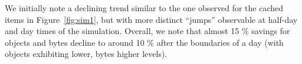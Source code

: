 \documentclass[letterpaper,journal,onecolumn,draftcls]{IEEEtran}
\begin{document}
We initially note a declining trend similar to the one observed for the cached items in Figure~\ref{fig:sim1}, but with more distinct ``jumps'' observable at half-day and day times of the simulation.
Overall, we note that almost 15 \% savings for objects and bytes decline to around 10 \% after the boundaries of a day (with objects exhibiting lower, bytes higher levels).


%
\end{document}
